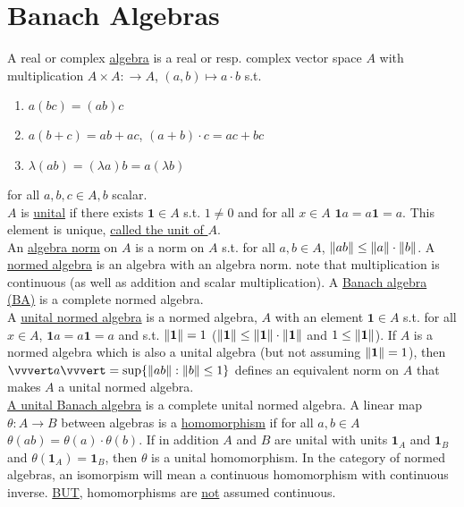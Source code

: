 \documentclass{article}
\begin{document}
\newpage 
\section{Banach Algebras}

A real or complex \noindent\underline{algebra} is a real or resp. complex vector space $A$ with multiplication $A\times A:\to A$, $(a,b)\mapsto a\cdot b$ s.t. 
\begin{enumerate}[label = (\roman*), align = left]
    \item $a(bc) = (ab)c$
    \item $a(b+c) = ab+ac$, $(a+b)\cdot c=ac +bc$
    \item $\lambda(ab) = (\lambda a)b= a(\lambda b)$
     
\end{enumerate}
for all $a,b,c\in A, b$ scalar.\\

$A$ is \noindent\underline{unital} if there exists $\mathbf{1}\in A$ s.t. $1\neq 0$ and for all $x\in A$ $\mathbf{1}a = a\mathbf{1}=a$. This element is unique, \noindent\underline{called the unit of $A$}.\\

An \noindent\underline{algebra norm} on $A$ is a norm on $A$ s.t. for all $a,b\in A$, $\left\lVert ab\right\rVert\leq \left\lVert a\right\rVert\cdot\left\lVert b\right\rVert$. A \noindent\underline{normed algebra} is an algebra with an algebra norm. note that multiplication is continuous (as well as addition and scalar multiplication). A \noindent\underline{Banach algebra (BA)} is a complete normed algebra.\\

A \noindent\underline{unital normed algebra} is a normed algebra, $A$ with an element $\mathbf{1}\in A$ s.t. for all $x\in A$, $\mathbf{1}a = a\mathbf{1}=a$ and s.t. $\left\lVert\mathbf{1}\right\rVert=1$ ($\left\lVert\mathbf{1}\right\rVert\leq \left\lVert\mathbf{1}\right\rVert\cdot \left\lVert\mathbf{1}\right\rVert$ and $1\leq \left\lVert\mathbf{1}\right\rVert$). If $A$ is a normed algebra which is also a unital algebra (but not assuming $\left\lVert\mathbf{1}\right\rVert = 1$), then $\vvvert a \vvvert =\sup\{\norm{ab}:\norm{b}\leq 1\}$ defines an equivalent norm on $A$ that makes $A$ a unital normed algebra.\\

\noindent\underline{A unital Banach algebra} is a complete unital normed algebra. A linear map $\theta:A\to B$ between algebras is a \noindent\underline{homomorphism} if for all $a,b\in A$ $\theta(ab)=\theta(a)\cdot \theta(b)$. If in addition $A$ and $B$ are unital with units $\mathbf{1}_A$ and $\mathbf{1}_B$ and $\theta(\mathbf{1}_A)=\mathbf{1}_B$, then $\theta$ is a unital homomorphism. In the category of normed algebras, an isomorpism will mean a continuous homomorphism with continuous inverse. \noindent\underline{BUT}, homomorphisms are \noindent\underline{not} assumed continuous.\\
\end{document}
